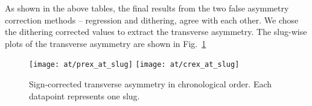 \begin{comment}
    & 343.4 & 154.8 & 155.1
    & 379.9 & 91.0  & 91.4
    & 493.9 & 93.0  & 94.1
    & 345.4 & 152.9 & 153.0
    & 387.2 & 91.3  & 91.9
    & 495.3 & 93.5  & 95.3
    & 344.5 & 153.7 & 153.9
    & 383.6 & 91.2  & 91.7
    & 494.5 & 93.2  & 94.6


\begin{table}
    \scriptsize
    \begin{tabular}{c | c c c | c c c}
	\hline
	\multirow{2}{*}{Target}	& \multicolumn{3}{c|}{Minirun Average (ppm)} & \multicolumn{3}{c}{Mulplot (ppm)}	\\
	\cline{2-7}
	    & raw	& reg	& dit	& raw	& reg	& dit	\\
	\hline
	\multicolumn{7}{c}{IHWP IN}   \\
	\hline
	C	& 659.82  & 558.10  & 558.71  & 659.84  & 557.97  & 558.56	\\
	Ca40    & 933.96  & 717.96  & 719.28  & 933.69  & 718.04  & 719.32	\\
	Ca48    & 994.35  & 775.30  & 776.19  & 994.78  & 775.61  & 776.50	\\
	Pb	& 1262.78 & 1168.89 & 1170.02 & 1261.95 & 1168.23 & 1169.35	\\
	\hline
	\multicolumn{7}{c}{IHWP OUT}   \\
	\hline
	C	& 8607.92 & 1558.19	& 8789.05 & 1313.51	& 8791.48 & 1314.60	 \\
	Ca40    & 8023.61 & 1751.48	& 7967.37 & 1353.29	& 7994.17 & 1355.00	 \\
	Ca48    & 7267.11 & 1516.31	& 8257.84 & 1180.23	& 8254.72 & 1183.33	 \\
	Pb	& 2089.10 & 2456.43	& 2420.15 & 2263.44	& 2456.87 & 2266.23	 \\
	\hline
	\multicolumn{7}{c}{COMBINED}   \\
	\hline
	C	& 661.92  & 558.72  & 559.27  & 661.73  & 558.75  & 559.29	\\
	Ca40    & 932.99  & 718.38  & 719.52  & 932.93  & 718.36  & 719.47	\\
	Ca48    & 996.46  & 775.93  & 777.46  & 996.67  & 776.15  & 777.63	\\
	Pb	& 1260.29 & 1163.94 & 1165.22 & 1259.54 & 1163.30 & 1164.57	\\
	\hline
    \end{tabular}
    \caption{Mini-wise average and mulplot average values for each target}
\end{table}
\end{comment}
As shown in the above tables, the final results from the two false asymmetry 
correction methods -- regression and dithering, agree with each other.
We chose the dithering corrected values to extract the transverse asymmetry.	%
The slug-wise plots of the transverse asymmetry are shown in Fig.~\ref{fig:AT_slug} 
\begin{figure}[!h]
    \centering
    \texttt{[image: at/prex\_at\_slug]}
    \texttt{[image: at/crex\_at\_slug]}
    \caption{Sign-corrected transverse asymmetry in chronological order. 
    Each datapoint represents one slug.}
    \label{fig:AT_slug}
\end{figure}

